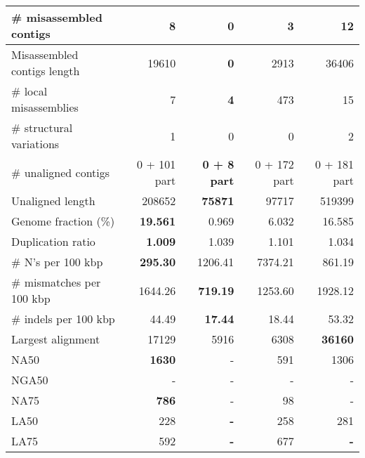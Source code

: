 \documentclass[12pt,a4paper]{article}
\begin{document}
\begin{table}[ht]
\begin{center}
\begin{tabular}{|l*{4}{|r}|}
\# misassembled contigs & 8 & {\bf 0} & 3 & 12 \\ \hline
Misassembled contigs length & 19610 & {\bf 0} & 2913 & 36406 \\ \hline
\# local misassemblies & 7 & {\bf 4} & 473 & 15 \\ \hline
\# structural variations & 1 & 0 & 0 & 2 \\ \hline
\# unaligned contigs & 0 + 101 part & {\bf 0 + 8 part} & 0 + 172 part & 0 + 181 part \\ \hline
Unaligned length & 208652 & {\bf 75871} & 97717 & 519399 \\ \hline
Genome fraction (\%) & {\bf 19.561} & 0.969 & 6.032 & 16.585 \\ \hline
Duplication ratio & {\bf 1.009} & 1.039 & 1.101 & 1.034 \\ \hline
\# N's per 100 kbp & {\bf 295.30} & 1206.41 & 7374.21 & 861.19 \\ \hline
\# mismatches per 100 kbp & 1644.26 & {\bf 719.19} & 1253.60 & 1928.12 \\ \hline
\# indels per 100 kbp & 44.49 & {\bf 17.44} & 18.44 & 53.32 \\ \hline
Largest alignment & 17129 & 5916 & 6308 & {\bf 36160} \\ \hline
NA50 & {\bf 1630} & - & 591 & 1306 \\ \hline
NGA50 & - & - & - & - \\ \hline
NA75 & {\bf 786} & - & 98 & - \\ \hline
LA50 & 228 & {\bf -} & 258 & 281 \\ \hline
LA75 & 592 & {\bf -} & 677 & {\bf -} \\ \hline
\end{tabular}
\end{center}
\end{table}
\end{document}
